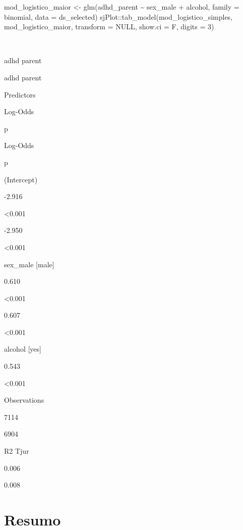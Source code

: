 \documentclass[
]{book}
\newenvironment{Shaded}{\begin{snugshade}}{\end{snugshade}}
\newcommand{\AttributeTok}[1]{\textcolor[rgb]{0.77,0.63,0.00}{#1}}
\newcommand{\ConstantTok}[1]{\textcolor[rgb]{0.00,0.00,0.00}{#1}}
\newcommand{\DecValTok}[1]{\textcolor[rgb]{0.00,0.00,0.81}{#1}}
\newcommand{\FunctionTok}[1]{\textcolor[rgb]{0.00,0.00,0.00}{#1}}
\newcommand{\NormalTok}[1]{#1}
\newcommand{\OtherTok}[1]{\textcolor[rgb]{0.56,0.35,0.01}{#1}}
\newcommand{\SpecialCharTok}[1]{\textcolor[rgb]{0.00,0.00,0.00}{#1}}
\begin{document}
\begin{Shaded}
\begin{Highlighting}[]
\NormalTok{mod\_logistico\_maior }\OtherTok{\textless{}{-}} \FunctionTok{glm}\NormalTok{(adhd\_parent }\SpecialCharTok{\textasciitilde{}}\NormalTok{ sex\_male }\SpecialCharTok{+} 
\NormalTok{                             alcohol, }
                           \AttributeTok{family =}\NormalTok{ binomial, }
                           \AttributeTok{data =}\NormalTok{ ds\_selected)}
\NormalTok{sjPlot}\SpecialCharTok{::}\FunctionTok{tab\_model}\NormalTok{(mod\_logistico\_simples, }
\NormalTok{                  mod\_logistico\_maior, }
                  \AttributeTok{transform =} \ConstantTok{NULL}\NormalTok{, }
                  \AttributeTok{show.ci =}\NormalTok{ F,}
                  \AttributeTok{digits =} \DecValTok{3}\NormalTok{)}
\end{Highlighting}
\end{Shaded}

~

adhd parent

adhd parent

Predictors

Log-Odds

p

Log-Odds

p

(Intercept)

-2.916

\textless0.001

-2.950

\textless0.001

sex\_male {[}male{]}

0.610

\textless0.001

0.607

\textless0.001

alcohol {[}yes{]}

0.543

\textless0.001

Observations

7114

6904

R2 Tjur

0.006

0.008

\hypertarget{resumo-7}{%
\section{Resumo}\label{resumo-7}}
\end{document}

